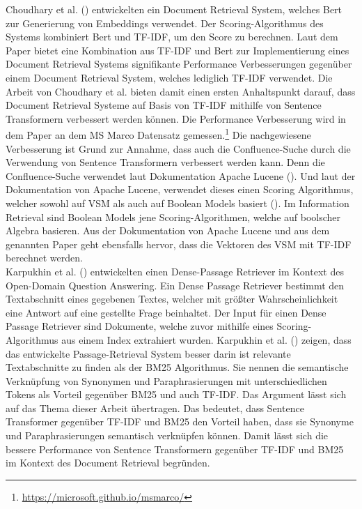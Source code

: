 Choudhary et al. (\citeyear{Choudhary_Guttikonda_Chowdhury_Learmonth_2020}) entwickelten ein Document Retrieval System, welches Bert zur Generierung von Embeddings verwendet.
Der Scoring-Algorithmus des Systems kombiniert Bert und TF-IDF, um den Score zu berechnen.
Laut dem Paper bietet eine Kombination aus TF-IDF und Bert zur Implementierung eines Document Retrieval Systems signifikante Performance Verbesserungen gegenüber einem Document Retrieval System, welches lediglich TF-IDF verwendet.
Die Arbeit von Choudhary et al. bieten damit einen ersten Anhaltspunkt darauf, dass Document Retrieval Systeme auf Basis von TF-IDF mithilfe von Sentence Transformern verbessert werden können.
Die Performance Verbesserung wird in dem Paper an dem MS Marco Datensatz gemessen.\footnote{\url{https://microsoft.github.io/msmarco/}}
Die nachgewiesene Verbesserung ist Grund zur Annahme, dass auch die Confluence-Suche durch die Verwendung von Sentence Transformern verbessert werden kann.
Denn die Confluence-Suche verwendet laut Dokumentation Apache Lucene (\cite{Confluence_Ranking}).
Und laut der Dokumentation von Apache Lucene, verwendet dieses einen Scoring Algorithmus, welcher sowohl auf VSM als auch auf Boolean Models basiert (\cite{Lucene_Scoring}).
Im Information Retrieval sind Boolean Models jene Scoring-Algorithmen, welche auf boolscher Algebra basieren.
Aus der Dokumentation von Apache Lucene und aus dem genannten Paper geht ebensfalls hervor, dass die Vektoren des VSM mit TF-IDF berechnet werden.\\

Karpukhin et al. (\citeyear{Karpukhin_Oguz_Min_Lewis_Wu_Edunov_Chen_Yih_2020}) entwickelten einen Dense-Passage Retriever im Kontext des Open-Domain Question Answering.
Ein Dense Passage Retriever bestimmt den Textabschnitt eines gegebenen Textes, welcher mit größter Wahrscheinlichkeit eine Antwort auf eine gestellte Frage beinhaltet.
Der Input für einen Dense Passage Retriever sind Dokumente, welche zuvor mithilfe eines Scoring-Algorithmus aus einem Index extrahiert wurden.
Karpukhin et al. (\citeyear{Karpukhin_Oguz_Min_Lewis_Wu_Edunov_Chen_Yih_2020}) zeigen, dass das entwickelte Passage-Retrieval System besser darin ist relevante Textabschnitte zu finden als der BM25 Algorithmus. 
Sie nennen die semantische Verknüpfung von Synonymen und Paraphrasierungen mit unterschiedlichen Tokens als Vorteil gegenüber BM25 und auch TF-IDF.
Das Argument lässt sich auf das Thema dieser Arbeit übertragen.
Das bedeutet, dass Sentence Transformer gegenüber TF-IDF und BM25 den Vorteil haben, dass sie Synonyme und Paraphrasierungen semantisch verknüpfen können.
Damit lässt sich die bessere Performance von Sentence Transformern gegenüber TF-IDF und BM25 im Kontext des Document Retrieval begründen.\\

